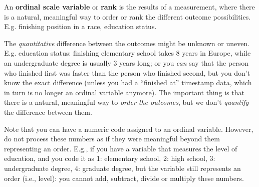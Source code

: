 \documentclass[
  11pt,
  a4paper,
  twoside,symmetric,openright]{book}
\theoremstyle{break}
\theoremstyle{break}
\begin{document}
\begin{definition}
\protect\hypertarget{def:defordinal}{}\label{def:defordinal}An \textbf{ordinal scale variable} or \textbf{rank} is the results of a measurement, where there is a natural, meaningful way to order or rank the different outcome possibilities. E.g. finishing position in a race, education status.
\end{definition}

The \emph{quantitative} difference between the outcomes might be unknown or uneven. E.g. education status: finishing elementary school takes 8 years in Europe, while an undergraduate degree is usually 3 years long; or you \emph{can} say that the person who finished first was faster than the person who finished second, but you don't know the exact difference (unless you had a ``finished at'' timestamp data, which in turn is no longer an ordinal variable anymore). The important thing is that there is a natural, meaningful way to \emph{order the outcomes}, but we don't \emph{quantify} the difference between them.

Note that you can have a numeric code assigned to an ordinal variable. However, do not process these numbers as if they were meaningful beyond them representing an order. E.g., if you have a variable that measures the level of education, and you code it as 1: elementary school, 2: high school, 3: undergraduate degree, 4: graduate degree, but the variable still represents an order (i.e., level): you cannot add, subtract, divide or multiply these numbers.
\end{document}
